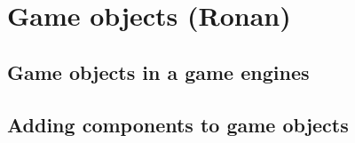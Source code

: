\section{Game objects (Ronan)}
\subsection{Game objects in a game engines}
\subsection{Adding components to game objects}
